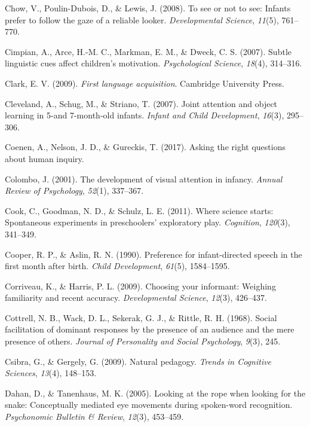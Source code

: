 \documentclass[oneside]{report}
\begin{document}
\hypertarget{ref-chow2008see}{}
Chow, V., Poulin-Dubois, D., \& Lewis, J. (2008). To see or not to see:
Infants prefer to follow the gaze of a reliable looker.
\emph{Developmental Science}, \emph{11}(5), 761--770.

\hypertarget{ref-cimpian2007subtle}{}
Cimpian, A., Arce, H.-M. C., Markman, E. M., \& Dweck, C. S. (2007).
Subtle linguistic cues affect children's motivation. \emph{Psychological
Science}, \emph{18}(4), 314--316.

\hypertarget{ref-clark2009first}{}
Clark, E. V. (2009). \emph{First language acquisition}. Cambridge
University Press.

\hypertarget{ref-cleveland2007joint}{}
Cleveland, A., Schug, M., \& Striano, T. (2007). Joint attention and
object learning in 5-and 7-month-old infants. \emph{Infant and Child
Development}, \emph{16}(3), 295--306.

\hypertarget{ref-coenen2017asking}{}
Coenen, A., Nelson, J. D., \& Gureckis, T. (2017). Asking the right
questions about human inquiry.

\hypertarget{ref-colombo2001development}{}
Colombo, J. (2001). The development of visual attention in infancy.
\emph{Annual Review of Psychology}, \emph{52}(1), 337--367.

\hypertarget{ref-cook2011science}{}
Cook, C., Goodman, N. D., \& Schulz, L. E. (2011). Where science starts:
Spontaneous experiments in preschoolers' exploratory play.
\emph{Cognition}, \emph{120}(3), 341--349.

\hypertarget{ref-cooper1990preference}{}
Cooper, R. P., \& Aslin, R. N. (1990). Preference for infant-directed
speech in the first month after birth. \emph{Child Development},
\emph{61}(5), 1584--1595.

\hypertarget{ref-corriveau2009choosing}{}
Corriveau, K., \& Harris, P. L. (2009). Choosing your informant:
Weighing familiarity and recent accuracy. \emph{Developmental Science},
\emph{12}(3), 426--437.

\hypertarget{ref-cottrell1968social}{}
Cottrell, N. B., Wack, D. L., Sekerak, G. J., \& Rittle, R. H. (1968).
Social facilitation of dominant responses by the presence of an audience
and the mere presence of others. \emph{Journal of Personality and Social
Psychology}, \emph{9}(3), 245.

\hypertarget{ref-csibra2009natural}{}
Csibra, G., \& Gergely, G. (2009). Natural pedagogy. \emph{Trends in
Cognitive Sciences}, \emph{13}(4), 148--153.

\hypertarget{ref-dahan2005looking}{}
Dahan, D., \& Tanenhaus, M. K. (2005). Looking at the rope when looking
for the snake: Conceptually mediated eye movements during spoken-word
recognition. \emph{Psychonomic Bulletin \& Review}, \emph{12}(3),
453--459.
\end{document}
